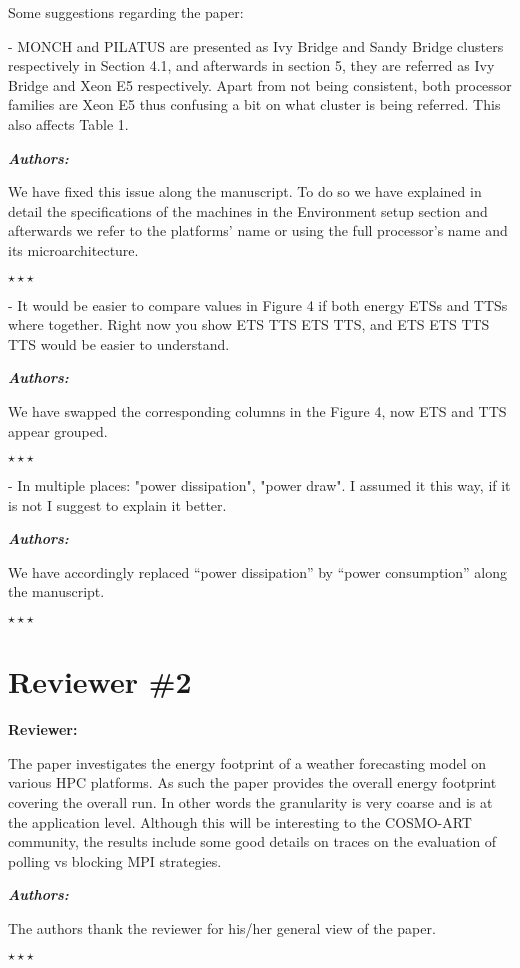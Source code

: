 \documentclass[a4paper,11pt]{article}
\newcounter{question}
\newcommand{\reviewerSay}{\vspace{0.2cm} {\bf \noindent } {\bf Reviewer:} \medskip \par}
\newcommand{\weReply}{\vspace{0.25cm} {\bf \noindent } \addtocounter{question}{1} \textbf{\emph{Authors:}} \medskip \em\par}
\newenvironment{weSay}{\bigskip \weReply \begin{it}}{\end{it}\begin{center} \samepage$\star \star \star$ \end{center}}
\begin{document}
Some suggestions regarding the paper:

- MONCH and PILATUS are presented as Ivy Bridge and Sandy Bridge clusters respectively in Section 4.1, 
and afterwards in section 5, they are referred as Ivy Bridge and Xeon E5 respectively. Apart from not 
being consistent, both processor families are Xeon E5 thus confusing a bit on what cluster is 
being referred. This also affects Table 1.

\begin{weSay}
We have fixed this issue along the manuscript. To do so we have explained in detail the specifications of the machines
in the Environment setup section and afterwards we refer to the platforms' name or using the
full processor's name and its microarchitecture.
\end{weSay}

- It would be easier to compare values in Figure 4 if both energy ETSs and TTSs where together. 
Right now you show ETS TTS ETS TTS, and ETS ETS TTS TTS would be easier to understand.

\begin{weSay}
We have swapped the corresponding columns in the Figure 4, now ETS and TTS appear grouped.
\end{weSay}

- In multiple places: "power dissipation", "power draw". I assumed it this way, if it is not 
I suggest to explain it better.

\begin{weSay}
We have accordingly replaced ``power dissipation'' by ``power consumption'' along the manuscript.
\end{weSay}


\newpage
\section*{Reviewer \#2}

\reviewerSay
The paper investigates the energy footprint of a weather forecasting model on various HPC platforms. 
As such the paper provides the overall energy footprint covering the overall run. In other words the 
granularity is very coarse and is at the application level. Although this will be interesting to the 
COSMO-ART community, the results include some good details on traces  on the
evaluation of polling vs blocking MPI strategies.

\begin{weSay}
The authors thank the reviewer for his/her general view of the paper.
\end{weSay}
\end{document}
